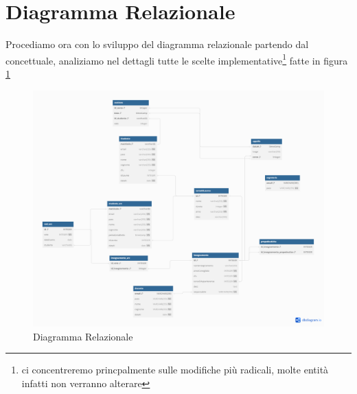 \section{Diagramma Relazionale}
Procediamo ora con lo sviluppo del diagramma relazionale partendo dal concettuale, analiziamo nel dettagli tutte le scelte  implementative\footnote{ci concentreremo princpalmente sulle modifiche più radicali, molte entità infatti non verranno alterare} fatte in figura \ref{fig:diagrammaRelazionale}
\begin{figure}
    \centering
    \includegraphics[width=0.9\linewidth]{images/relazionale.png}
    \caption{Diagramma Relazionale}
    \label{fig:diagrammaRelazionale}
\end{figure}
